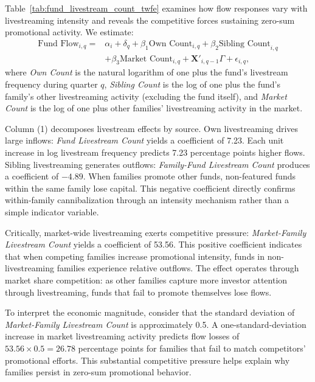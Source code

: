 \documentclass[12pt]{article}
\begin{document}
Table~\ref{tab:fund_livestream_count_twfe} examines how flow responses vary with livestreaming intensity and reveals the competitive forces sustaining zero-sum promotional activity. We estimate:
\begin{equation}
    \label{eq:fund_intensity_appendix}
    \begin{split}
        \text{Fund Flow}_{i,q} = & \alpha_i + \delta_q + \beta_1 \text{Own Count}_{i,q} + \beta_2 \text{Sibling Count}_{i,q} \\
                                 & + \beta_3 \text{Market Count}_{i,q} + \mathbf{X}'_{i,q-1} \Gamma + \epsilon_{i,q},
    \end{split}
\end{equation}
where \textit{Own Count} is the natural logarithm of one plus the fund's livestream frequency during quarter $q$, \textit{Sibling Count} is the log of one plus the fund's family's other livestreaming activity (excluding the fund itself), and \textit{Market Count} is the log of one plus other families' livestreaming activity in the market.

Column (1) decomposes livestream effects by source. Own livestreaming drives large inflows: \textit{Fund Livestream Count} yields a coefficient of 7.23. Each unit increase in log livestream frequency predicts 7.23 percentage points higher flows. Sibling livestreaming generates outflows: \textit{Family-Fund Livestream Count} produces a coefficient of $-4.89$. When families promote other funds, non-featured funds within the same family lose capital. This negative coefficient directly confirms within-family cannibalization through an intensity mechanism rather than a simple indicator variable.

Critically, market-wide livestreaming exerts competitive pressure: \textit{Market-Family Livestream Count} yields a coefficient of 53.56. This positive coefficient indicates that when competing families increase promotional intensity, funds in non-livestreaming families experience relative outflows. The effect operates through market share competition: as other families capture more investor attention through livestreaming, funds that fail to promote themselves lose flows.

To interpret the economic magnitude, consider that the standard deviation of \textit{Market-Family Livestream Count} is approximately 0.5. A one-standard-deviation increase in market livestreaming activity predicts flow losses of $53.56 \times 0.5 = 26.78$ percentage points for families that fail to match competitors' promotional efforts. This substantial competitive pressure helps explain why families persist in zero-sum promotional behavior.
\end{document}
